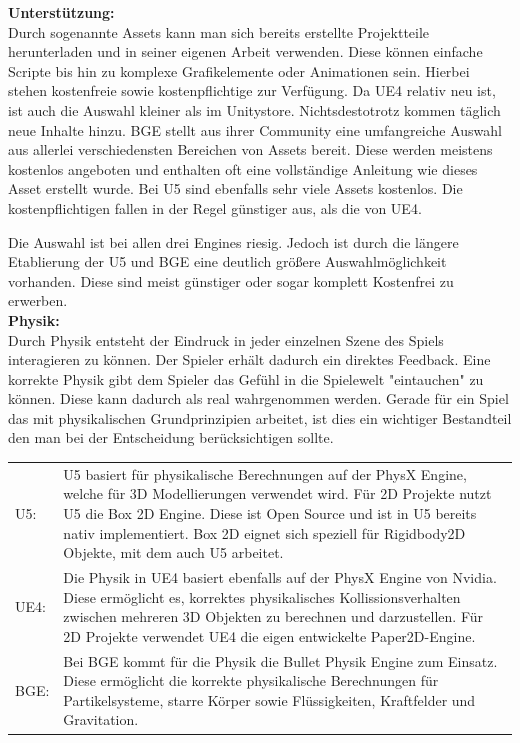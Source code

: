 \textbf{Unterstützung:}\\
Durch sogenannte Assets kann man sich bereits erstellte Projektteile herunterladen und in seiner eigenen Arbeit verwenden. Diese können einfache Scripte bis hin zu komplexe Grafikelemente oder Animationen sein. Hierbei stehen kostenfreie sowie kostenpflichtige zur Verfügung. Da \ac{UE4} relativ neu ist, ist auch die Auswahl kleiner als im Unitystore. Nichtsdestotrotz kommen täglich neue Inhalte hinzu. \ac{BGE} stellt aus ihrer Community eine umfangreiche Auswahl aus allerlei verschiedensten Bereichen von Assets bereit. Diese werden meistens kostenlos angeboten und enthalten oft eine vollständige Anleitung wie dieses Asset erstellt wurde. Bei \ac{U5} sind ebenfalls sehr viele Assets kostenlos. Die kostenpflichtigen fallen in der Regel günstiger aus, als die von \ac{UE4}.

Die Auswahl ist bei allen drei Engines riesig. Jedoch ist durch die längere Etablierung der \ac{U5} und \ac{BGE} eine deutlich größere Auswahlmöglichkeit vorhanden. Diese sind meist günstiger oder sogar komplett Kostenfrei zu erwerben.\\

\textbf{Physik:}\\
Durch Physik entsteht der Eindruck in jeder einzelnen Szene des Spiels interagieren zu können. Der Spieler erhält dadurch ein direktes Feedback. Eine korrekte Physik gibt dem Spieler das Gefühl in die Spielewelt "eintauchen" zu können. Diese kann dadurch als real wahrgenommen werden. Gerade für ein Spiel das mit physikalischen Grundprinzipien arbeitet, ist dies ein wichtiger Bestandteil den man bei der Entscheidung berücksichtigen sollte. 
\begin{table}[H]
\centering
\begin{tabular}{lp{14.5cm}}

\ac{U5}: &
\ac{U5} basiert für physikalische Berechnungen auf der PhysX Engine, welche für 3D Modellierungen verwendet wird. Für 2D Projekte nutzt \ac{U5} die Box 2D Engine. Diese ist Open Source und ist in \ac{U5} bereits nativ implementiert. Box 2D eignet sich speziell für Rigidbody2D Objekte, mit dem auch \ac{U5} arbeitet.\\
\ac{UE4}:& Die Physik in \ac{UE4} basiert ebenfalls auf der PhysX Engine von Nvidia. Diese ermöglicht es, korrektes physikalisches Kollissionsverhalten zwischen mehreren 3D Objekten zu berechnen und darzustellen. Für 2D Projekte verwendet \ac{UE4} die eigen entwickelte Paper2D-Engine. \\

\ac{BGE}:&
Bei \ac{BGE} kommt für die Physik die Bullet Physik Engine zum Einsatz. Diese ermöglicht die korrekte physikalische Berechnungen für Partikelsysteme, starre Körper sowie Flüssigkeiten, Kraftfelder und Gravitation.
\end{tabular}
\end{table}


